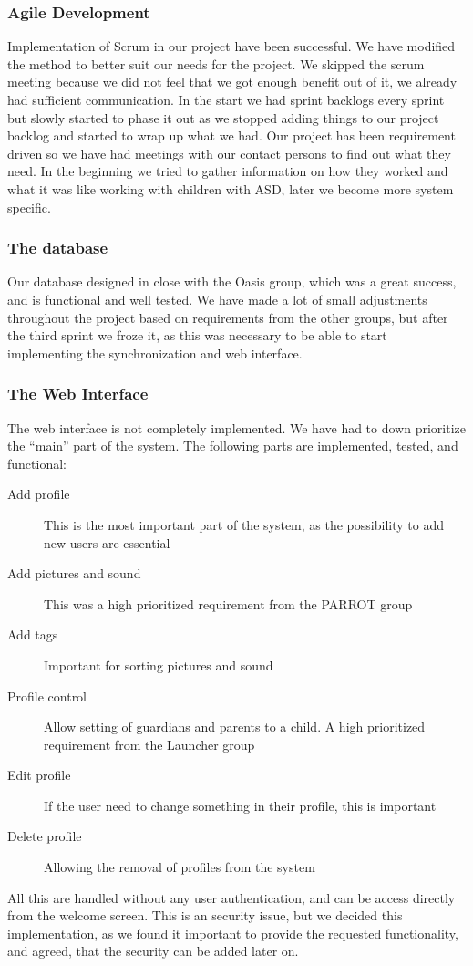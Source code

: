 \subsubsection*{Agile Development}
Implementation of Scrum in our project have been successful. We have modified the method to better suit our needs for the project. We skipped the scrum meeting because we did not feel that we got enough benefit out of it, we already had sufficient communication. In the start we had sprint backlogs every sprint but slowly started to phase it out as we stopped adding things to our project backlog and started to wrap up what we had. Our project has been requirement driven so we have had meetings with our contact persons to find out what they need. In the beginning we tried to gather information on how they worked and what it was like working with children with ASD, later we become more system specific. 

\subsubsection*{The database}
Our database designed in close with the Oasis group, which was a great success, and is functional and well tested. We have made a lot of small adjustments throughout the project based on requirements from the other groups, but after the third sprint we froze it, as this was necessary to be able to start implementing the synchronization and web interface.

\subsubsection*{The Web Interface}
The web interface is not completely implemented. We have had to down prioritize the ``main'' part of the system. The following parts are implemented, tested, and functional:
\begin{description}
	\item[Add profile] This is the most important part of the system, as the possibility to add new users are essential
	\item[Add pictures and sound] This was a high prioritized requirement from the PARROT group
	\item[Add tags] Important for sorting pictures and sound
	\item[Profile control] Allow setting of guardians and parents to a child. A high prioritized requirement from the Launcher group
	\item[Edit profile] If the user need to change something in their profile, this is important
	\item[Delete profile] Allowing the removal of profiles from the system
\end{description}
All this are handled without any user authentication, and can be access directly from the welcome screen. This is an security issue, but we decided this implementation, as we found it important to provide the requested functionality, and agreed, that the security can be added later on.

